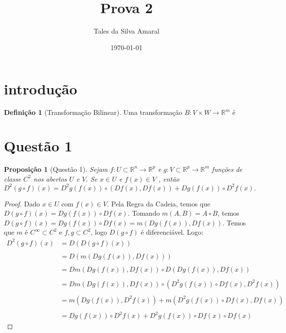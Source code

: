 \documentclass{article}
\title{Prova 2}
\author{Tales da Silva Amaral}
\date{\today}
\newtheorem{prop}{Proposição}[section]
\theoremstyle{theorem}
\theoremstyle{lemma}
\theoremstyle{definition}
\newtheorem{definicao}{Definição}[section]
\theoremstyle{remark}
\begin{document}
\maketitle
\newpage

\section{introdução}
\begin{definicao}[Transformação Bilinear]
	Uma transformação \( B : V\times W \to \mathbb{R}^m \) é 
\end{definicao}

\section{Questão 1}
\begin{prop}[Questão 1]
	Sejam \(f: U \subset \mathbb{R}^n \to \mathbb{R}^p \) e \( g: V \subset \mathbb{R}^p \to \mathbb{R}^m \) funções de classe \( C^2\)  nos abertos \( U\) e \(V\). Se \( x\in U\) e \( f(x) \in V\) , então \[ D^{2}(g\circ f)(x) = D^2g(f(x)) \circ \left(Df(x), Df(x)\right) + Dg(f(x)) \circ D^2f(x). \]
\end{prop}
\begin{proof}
	Dado \( x\in U \) com \( f(x) \in V\). Pela Regra da Cadeia, temos que \( D( g\circ f)(x) = Dg(f(x)) \circ Df(x) \). Tomando \(m(A,B) = A\circ B\), temos \(D(g\circ f)(x) = Dg(f(x))\circ Df(x) = m(Dg(f(x)), Df(x)) \). Temos que \( m\) é \(C^{\infty} \subset C^2 \) e \( f,g \subset C^2\), logo \( D(g\circ f) \) é diferenciável. Logo:
\begin{align*}
	D^2(g\circ f)(x) &= D( D(g\circ f)(x)) \\~\\
	&= D(m( Dg(f(x)), Df(x))) \\~\\
	&= Dm( Dg(f(x)), Df(x)) \circ D( Dg(f(x)), Df(x))  \\~\\
	&= Dm( Dg(f(x)), Df(x)) \circ ( D^2g(f(x)) \circ Df(x) , D^2f(x))  \\~\\
	&= m( Dg(f(x)) , D^{2}f(x) )  + m(D^{2}g(f(x)) \circ Df(x) , Df(x)) \\~\\
	&=  Dg(f(x)) \circ D^{2}f(x)   + D^{2}g(f(x)) \circ Df(x) \circ  Df(x) 
\end{align*}
\end{proof}
\end{document}
